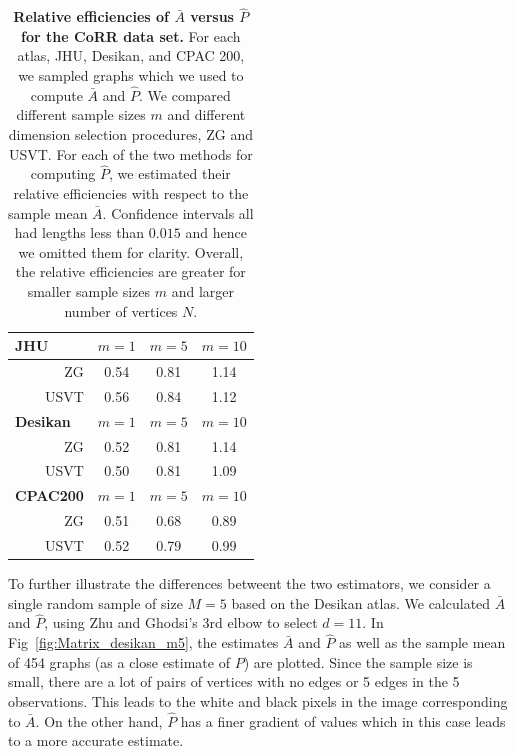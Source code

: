 \documentclass[10pt,letterpaper]{article}
\begin{document}
\begin{table}[!htb]
    \caption{{\bf Relative efficiencies of $\bar{A}$ versus $\hat{P}$ for the CoRR data set.}
    For each atlas, JHU, Desikan, and CPAC 200, we sampled graphs which we used to compute $\bar{A}$ and $\hat{P}$.
     We compared different sample sizes $m$ and different dimension selection procedures, ZG and USVT.
    For each of the two methods for computing $\hat{P}$, we estimated their relative efficiencies with respect to the sample mean $\bar{A}$.
    Confidence intervals all had lengths less than $0.015$ and hence we omitted them for clarity.
    Overall, the relative efficiencies are greater for smaller sample sizes $m$ and larger number of vertices $N$. 
    } 
    \label{tab:corr_re}
    \centering

\begin{tabular}{rccc}\toprule
\multicolumn{1}{l}{\textbf{JHU}} & $m=1$  & $m=5$  & $m=10$  \\\midrule
ZG      & 0.54 & 0.81 & 1.14 \\
USVT    & 0.56 & 0.84 & 1.12 \\\midrule
\multicolumn{1}{l}{\textbf{Desikan}} & $m=1$  & $m=5$  & $m=10$  \\ \midrule
ZG      & 0.52 & 0.81 & 1.14 \\
USVT    & 0.50 & 0.81 & 1.09 \\\midrule
\multicolumn{1}{l}{\textbf{CPAC200}} & $m=1$  & $m=5$  & $m=10$  \\\midrule
ZG      & 0.51 & 0.68 & 0.89 \\
USVT    & 0.52 & 0.79 & 0.99 \\\bottomrule
\end{tabular}
\end{table}



To further illustrate the differences betweent the two estimators, we consider a single random sample of size $M=5$ based on the Desikan atlas.
We calculated $\bar{A}$ and $\hat{P}$, using  Zhu and Ghodsi's 3rd elbow to select $d=11$. 
In Fig~\ref{fig:Matrix_desikan_m5}, the estimates $\bar{A}$ and $\hat{P}$ as well as the sample mean of 454 graphs (as a close estimate of $P$) are plotted. 
Since the sample size is small, there are a lot of pairs of vertices with no edges or 5 edges in the 5 observations.
This leads to the white and black pixels in the image corresponding to $\bar{A}$.
On the other hand, $\hat{P}$ has a finer gradient of values which in this case leads to a more accurate estimate.
\end{document}

